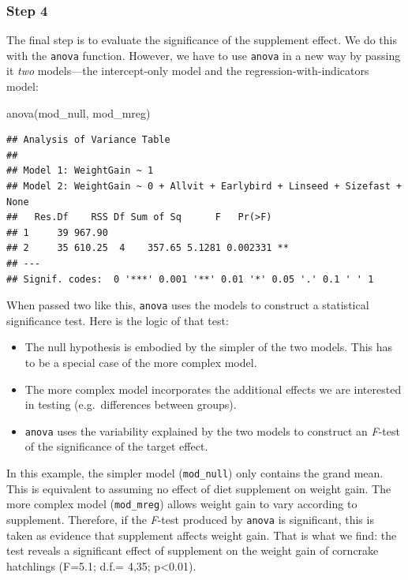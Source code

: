\documentclass[
]{book}
\newenvironment{Shaded}{\begin{snugshade}}{\end{snugshade}}
\newcommand{\FunctionTok}[1]{\textcolor[rgb]{0.00,0.00,0.00}{#1}}
\newcommand{\NormalTok}[1]{#1}
\providecommand{\tightlist}{%
  \setlength{\itemsep}{0pt}\setlength{\parskip}{0pt}}
\begin{document}
\hypertarget{step-4}{%
\subsubsection{Step 4}\label{step-4}}

The final step is to evaluate the significance of the supplement effect. We do this with the \texttt{anova} function. However, we have to use \texttt{anova} in a new way by passing it \emph{two} models---the intercept-only model and the regression-with-indicators model:

\begin{Shaded}
\begin{Highlighting}[]
\FunctionTok{anova}\NormalTok{(mod\_null, mod\_mreg)}
\end{Highlighting}
\end{Shaded}

\begin{verbatim}
## Analysis of Variance Table
## 
## Model 1: WeightGain ~ 1
## Model 2: WeightGain ~ 0 + Allvit + Earlybird + Linseed + Sizefast + None
##   Res.Df    RSS Df Sum of Sq      F   Pr(>F)   
## 1     39 967.90                                
## 2     35 610.25  4    357.65 5.1281 0.002331 **
## ---
## Signif. codes:  0 '***' 0.001 '**' 0.01 '*' 0.05 '.' 0.1 ' ' 1
\end{verbatim}

When passed two like this, \texttt{anova} uses the models to construct a statistical significance test. Here is the logic of that test:

\begin{itemize}
\tightlist
\item
  The null hypothesis is embodied by the simpler of the two models. This has to be a special case of the more complex model.
\item
  The more complex model incorporates the additional effects we are interested in testing (e.g.~differences between groups).
\item
  \texttt{anova} uses the variability explained by the two models to construct an \emph{F}-test of the significance of the target effect.
\end{itemize}

In this example, the simpler model (\texttt{mod\_null}) only contains the grand mean. This is equivalent to assuming no effect of diet supplement on weight gain. The more complex model (\texttt{mod\_mreg}) allows weight gain to vary according to supplement. Therefore, if the \emph{F}-test produced by \texttt{anova} is significant, this is taken as evidence that supplement affects weight gain. That is what we find: the test reveals a significant effect of supplement on the weight gain of corncrake hatchlings (F=5.1; d.f.= 4,35; p\textless0.01).
\end{document}
